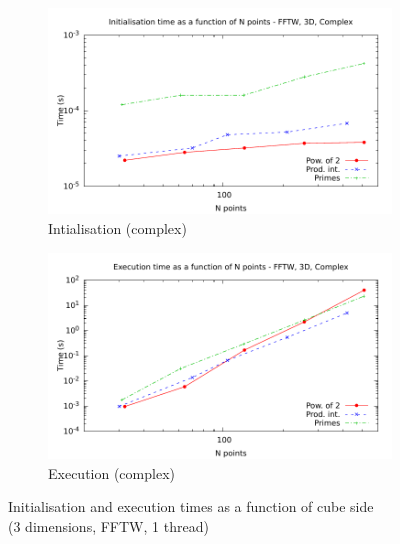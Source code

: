 \documentclass[12pt, a4paper]{article}
\begin{document}
\begin{figure}[H]
\begin{subfigure}{.5\textwidth}
\centering
\includegraphics[width=.9\linewidth]{graphs/3d-fftw-init-c.pdf}
\caption{Intialisation (complex)}
\label{3DFFTWCI}
\end{subfigure}%
\begin{subfigure}{.5\textwidth}
\centering
\includegraphics[width=.9\linewidth]{graphs/3d-fftw-exec-c.pdf}
\caption{Execution (complex)}
\label{3DFFTWC}
\end{subfigure}
\caption{Initialisation and execution times as a function of cube side\\(3 dimensions, FFTW, 1 thread)}
\label{3DFFTW}
\end{figure}
\end{document}
